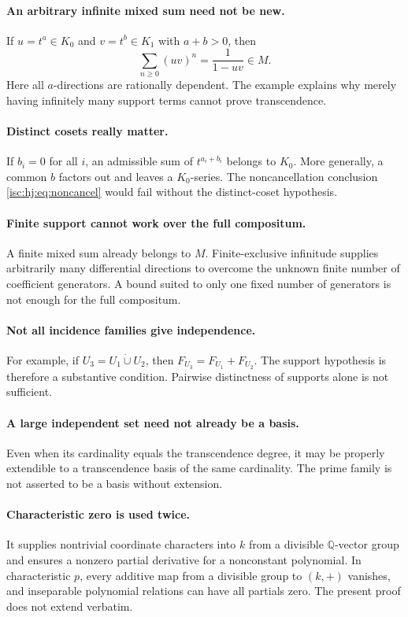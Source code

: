 \documentclass[11pt,letterpaper]{article}
\theoremstyle{definition}
\theoremstyle{remark}
\newcommand{\Q}{\mathbb Q}
\numberwithin{equation}{section}
\begin{document}
\paragraph{An arbitrary infinite mixed sum need not be new.}
If $u=t^a\in K_0$ and $v=t^b\in K_1$ with $a+b>0$, then
\[
 \sum_{n\geq0}(uv)^n=\frac1{1-uv}\in M.
\]
Here all $a$-directions are rationally dependent. The example explains
why merely having infinitely many support terms cannot prove
transcendence.

\paragraph{Distinct cosets really matter.}
If $b_i=0$ for all $i$, an admissible sum of $t^{a_i+b_i}$ belongs to
$K_0$. More generally, a common $b$ factors out and leaves a $K_0$-series.
The noncancellation conclusion \eqref{isc:hj:eq:noncancel} would fail without
the distinct-coset hypothesis.

\paragraph{Finite support cannot work over the full compositum.}
A finite mixed sum already belongs to $M$. Finite-exclusive infinitude
supplies arbitrarily many differential directions to overcome the
unknown finite number of coefficient generators. A bound suited to only
one fixed number of generators is not enough for the full compositum.

\paragraph{Not all incidence families give independence.}
For example, if $U_3=U_1\mathbin{\dot\cup}U_2$, then
$F_{U_3}=F_{U_1}+F_{U_2}$. The support hypothesis is therefore a
substantive condition. Pairwise distinctness of supports alone is not
sufficient.

\paragraph{A large independent set need not already be a basis.}
Even when its cardinality equals the transcendence degree, it may be
properly extendible to a transcendence basis of the same cardinality.
The prime family is not asserted to be a basis without extension.

\paragraph{Characteristic zero is used twice.}
It supplies nontrivial coordinate characters into $k$ from a divisible
$\Q$-vector group and ensures a nonzero partial derivative for a
nonconstant polynomial. In characteristic $p$, every additive map from
a divisible group to $(k,+)$ vanishes, and inseparable polynomial
relations can have all partials zero. The present proof does not extend
verbatim.
\end{document}
